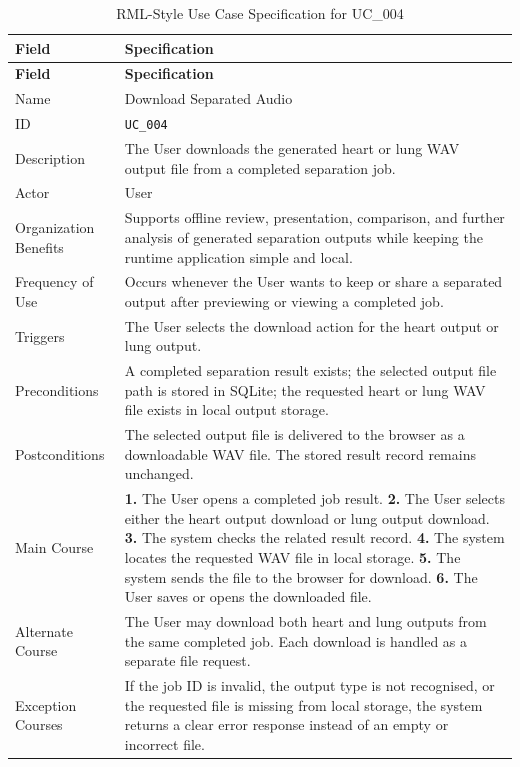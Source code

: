 \clearpage
\begin{longtable}{@{}p{} p{}@{}}
  \caption{RML-Style Use Case Specification for UC\_004}
  \label{tab:uc004-download-separated-audio} \\
  \toprule
  \textbf{Field} & \textbf{Specification} \\
  \midrule
  \endfirsthead
  \toprule
  \textbf{Field} & \textbf{Specification} \\
  \midrule
  \endhead
  \bottomrule
  \endfoot
  Name & Download Separated Audio \\
  ID & \texttt{UC\_004} \\
  Description & The User downloads the generated heart or lung WAV output file from a completed separation job. \\
  Actor & User \\
  Organization Benefits & Supports offline review, presentation, comparison, and further analysis of generated separation outputs while keeping the runtime application simple and local. \\
  Frequency of Use & Occurs whenever the User wants to keep or share a separated output after previewing or viewing a completed job. \\
  Triggers & The User selects the download action for the heart output or lung output. \\
  Preconditions & A completed separation result exists; the selected output file path is stored in SQLite; the requested heart or lung WAV file exists in local output storage. \\
  Postconditions & The selected output file is delivered to the browser as a downloadable WAV file. The stored result record remains unchanged. \\
  Main Course & \textbf{1.} The User opens a completed job result. \newline
  \textbf{2.} The User selects either the heart output download or lung output download. \newline
  \textbf{3.} The system checks the related result record. \newline
  \textbf{4.} The system locates the requested WAV file in local storage. \newline
  \textbf{5.} The system sends the file to the browser for download. \newline
  \textbf{6.} The User saves or opens the downloaded file. \\
  Alternate Course & The User may download both heart and lung outputs from the same completed job. Each download is handled as a separate file request. \\
  Exception Courses & If the job ID is invalid, the output type is not recognised, or the requested file is missing from local storage, the system returns a clear error response instead of an empty or incorrect file. \\
\end{longtable}

